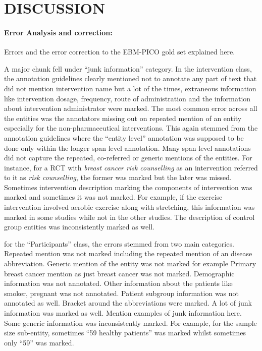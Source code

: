 \documentclass[10.7pt,]{article}
\let\oldparagraph\paragraph
\renewcommand{\paragraph}[1]{\oldparagraph{#1}\mbox{}}
\begin{document}
\section{DISCUSSION}\label{discussion}
%
\paragraph{Error Analysis and correction: } 

Errors and the error correction to the EBM-PICO gold set explained here. 

A major chunk fell under ``junk information'' category.
In the intervention class, the annotation guidelines clearly mentioned not to annotate any part of text that did not mention intervention name but a lot of the times, extraneous information like intervention dosage, frequency, route of administration and the information about intervention administrator were marked. 
The most common error across all the entities was the annotators missing out on repeated mention of an entity especially for the non-pharmaceutical interventions. 
This again stemmed from the annotation guidelines where the ``entity level'' annotation was supposed to be done only within the longer span level annotation.
Many span level annotations did not capture the repeated, co-referred or generic mentions of the entities.
For instance, for a RCT with \textit{breast cancer risk counselling} as an intervention referred to it as \textit{risk counselling}, the former was marked but the later was missed.
Sometimes intervention description marking the components of intervention was marked and sometimes it was not marked.
For example, if the exercise intervention involved aerobic exercise along with stretching, this information was marked in some studies while not in the other studies.
The description of control group entities was inconsistently marked as well.

for the ``Participants'' class, the errors stemmed from two main categories.
Repeated mention was not marked including the repeated mention of an disease abbreviation.
Generic mention of the entity was not marked for example Primary breast cancer mention as just breast cancer was not marked. 
Demographic information was not annotated.
Other information about the patients like smoker, pregnant was not annotated.
Patient subgroup information was not annotated as well.
Bracket around the abbreviations were marked.
A lot of junk information was marked as well. Mention examples of junk information here.
Some generic information was inconsistently marked. For example, for the sample size sub-entity, sometimes ``59 healthy patients'' was marked whilst sometimes only ``59'' was marked.
\end{document}
